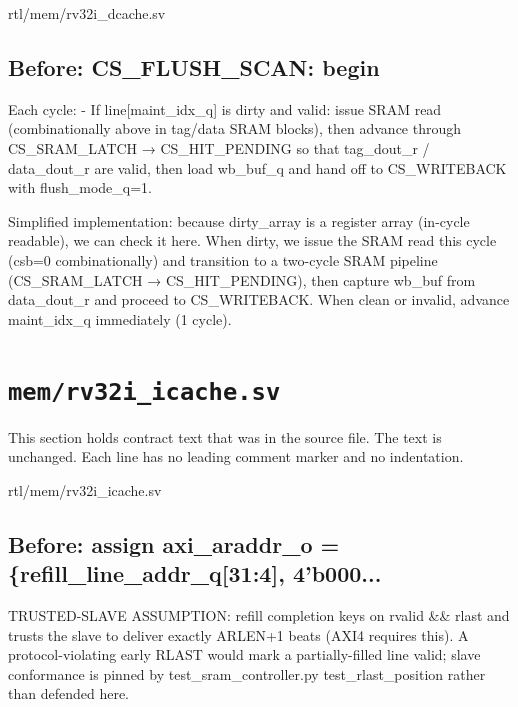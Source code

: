 \begin{relocated}{rtl/mem/rv32i_dcache.sv}
\subsection*{Before: CS\_FLUSH\_SCAN: begin}

\begin{textblock}
Each cycle:
  - If line[maint_idx_q] is dirty and valid: issue SRAM read
    (combinationally above in tag/data SRAM blocks), then advance
    through CS_SRAM_LATCH → CS_HIT_PENDING so that tag_dout_r /
    data_dout_r are valid, then load wb_buf_q and hand off to
    CS_WRITEBACK with flush_mode_q=1.

Simplified implementation: because dirty_array is a register array
(in-cycle readable), we can check it here.  When dirty, we issue
the SRAM read this cycle (csb=0 combinationally) and transition to
a two-cycle SRAM pipeline (CS_SRAM_LATCH → CS_HIT_PENDING), then
capture wb_buf from data_dout_r and proceed to CS_WRITEBACK.
When clean or invalid, advance maint_idx_q immediately (1 cycle).
\end{textblock}

\end{relocated}

\section{\texttt{mem/rv32i\_icache.sv}}\label{ds:mod:rv32i-icache}

This section holds contract text that was in the source file. The text is unchanged. Each line has no leading comment marker and no indentation.

\begin{relocated}{rtl/mem/rv32i_icache.sv}

\subsection*{Before: assign axi\_araddr\_o  = \{refill\_line\_addr\_q[31:4], 4'b000...}

\begin{textblock}
  TRUSTED-SLAVE ASSUMPTION: refill completion keys on rvalid && rlast and
  trusts the slave to deliver exactly ARLEN+1 beats (AXI4 requires this).
  A protocol-violating early RLAST would mark a partially-filled line
  valid; slave conformance is pinned by test_sram_controller.py
  test_rlast_position rather than defended here.
\end{textblock}

\end{relocated}









